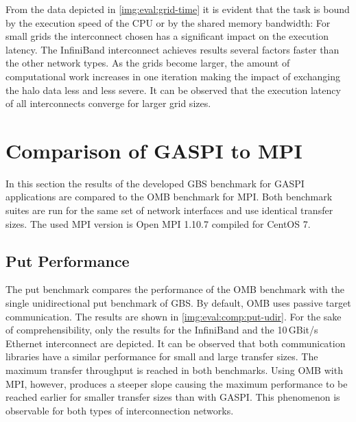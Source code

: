 From the data depicted in \autoref{img:eval:grid-time} it is evident that the task is bound by the execution speed of the \ac{CPU} or by the shared memory bandwidth: For small grids the interconnect chosen has a significant impact on the execution latency. The InfiniBand interconnect achieves results several factors faster than the other network types. As the grids become larger, the amount of computational work increases in one iteration making the impact of exchanging the halo data less and less severe. It can be observed that the execution latency of all interconnects converge for larger grid sizes. 


\section{Comparison of \acs{GASPI} to \acs{MPI}}

In this section the results of the developed \ac{GBS} benchmark for \ac{GASPI} applications are compared to the  \ac{OMB} benchmark for \ac{MPI}. Both benchmark suites are run for the same set of network interfaces and use identical transfer sizes. The used \ac{MPI} version is Open MPI 1.10.7 compiled for CentOS 7.

\subsection{Put Performance}

The put benchmark compares the performance of the \ac{OMB} benchmark  with the single unidirectional put benchmark of \ac{GBS}. By default, \ac{OMB} uses passive target communication. The results are shown in \autoref{img:eval:comp:put-udir}. For the sake of comprehensibility, only the results for the InfiniBand and the 10\,GBit/s Ethernet interconnect are depicted. It can be observed that both communication libraries have a similar performance for small and large transfer sizes. The maximum transfer throughput is reached in both benchmarks. Using \ac{OMB} with \ac{MPI}, however, produces a steeper slope causing the maximum performance to be reached earlier for smaller transfer sizes than with \ac{GASPI}. This phenomenon is observable for both types of interconnection networks.

